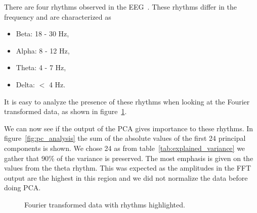 There are four rhythms observed in the EEG~\cite[chapter~11]{Ganong1997}. These rhythms differ in the frequency and are characterized as

\begin{itemize}
	\item Beta: 18 - 30 Hz,
	\item Alpha: 8 - 12 Hz,
	\item Theta: 4 - 7 Hz,
	\item Delta: $<$ 4 Hz.
\end{itemize}

It is easy to analyze the presence of these rhythms when looking at the Fourier transformed data, as shown in figure~\ref{fig:eeg_with_rhythm}.

We can now see if the output of the PCA gives importance to these rhythms. In figure~\ref{fig:pc_analysis} the sum of the absolute values of the first 24 principal components is shown. We chose 24 as from table~\ref{tab:explained_variance} we gather that 90\% of the variance is preserved. The most emphasis is given on the values from the theta rhythm. This was expected as the amplitudes in the FFT output are the highest in this region and we did not normalize the data before doing PCA.


\newpage
\begin{figure}[h]
	\centering	
	
	\caption{Fourier transformed data with rhythms highlighted.}
	\label{fig:eeg_with_rhythm}
\end{figure}


